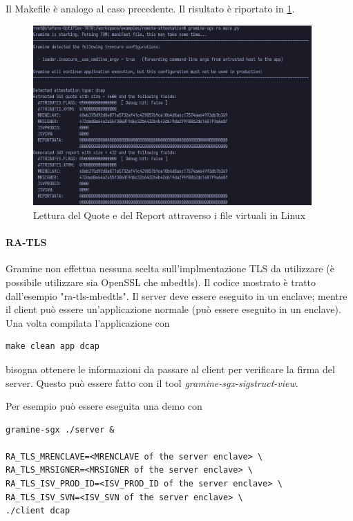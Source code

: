 \documentclass{article}
\begin{document}


Il Makefile è analogo al caso precedente. Il risultato è riportato in \cref{fig:ra-low-level-example}.

\begin{figure}[H]
  \begin{center}
    \includegraphics[width=0.95\textwidth]{figures/ch3/ra-low-level-example.png}
  \end{center}
  \caption{Lettura del Quote e del Report attraverso i file virtuali in Linux}\label{fig:ra-low-level-example}
\end{figure}

\paragraph{RA-TLS}
Gramine non effettua nessuna scelta sull'implmentazione TLS da utilizzare (è possibile utilizzare sia OpenSSL che mbedtls). Il codice mostrato è tratto dall'esempio "ra-tls-mbedtls". Il server deve essere eseguito in un enclave; mentre il client può essere un'applicazione normale (può essere eseguito in un enclave). Una volta compilata l'applicazione con

\begin{verbatim}
make clean app dcap 
\end{verbatim}

bisogna ottenere le informazioni da passare al client per verificare la firma del server. Questo può essere fatto con il tool \textit{gramine-sgx-sigstruct-view}. 

Per esempio può essere eseguita una demo con 
\begin{verbatim}
gramine-sgx ./server &

RA_TLS_MRENCLAVE=<MRENCLAVE of the server enclave> \
RA_TLS_MRSIGNER=<MRSIGNER of the server enclave> \
RA_TLS_ISV_PROD_ID=<ISV_PROD_ID of the server enclave> \
RA_TLS_ISV_SVN=<ISV_SVN of the server enclave> \
./client dcap
\end{verbatim}
\end{document}
